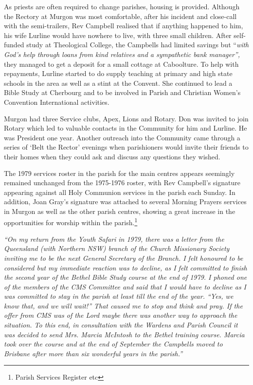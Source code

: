 As priests are often required to change parishes, housing is provided. Although the Rectory at Murgon was most comfortable, after his incident and close-call with the semi-trailers, Rev Campbell realised that if anything happened to him, his wife Lurline would have nowhere to live, with three small children. After self-funded study at Theological College, the Campbells had limited savings but ``\emph{with God's help through loans from kind relatives and a sympathetic bank manager'',} they managed to get a deposit for a small cottage at Caboolture. To help with repayments, Lurline started to do supply teaching at primary and high state schools in the area as well as a stint at the Convent. She continued to lead a Bible Study at Cherbourg and to be involved in Parish and Christian Women's Convention International activities.



Murgon had three Service clubs, Apex, Lions and Rotary. Don was invited to join Rotary which led to valuable contacts in the Community for him and Lurline. He was President one year. Another outreach into the Community came through a series of `Belt the Rector' evenings when parishioners would invite their friends to their homes when they could ask and discuss any questions they wished.



The 1979 services roster in the parish for the main centres appears seemingly remained unchanged from the 1975-1976 roster, with Rev Campbell's signature appearing against all Holy Communion services in the parish each Sunday. In addition, Joan Gray's signature was attached to several Morning Prayers services in Murgon as well as the other parish centres, showing a great increase in the opportunities for worship within the parish.\footnote{Parish Services Register etc}


\emph{``On my return from the Youth Safari in 1979, there was a letter from the Queensland (with Northern NSW) branch of the Church Missionary Society inviting me to be the next General Secretary of the Branch. I felt honoured to be considered but my immediate reaction was to decline, as I felt committed to finish the second year of the Bethel Bible Study course at the end of 1979. I phoned one of the members of the CMS Committee and said that I would have to decline as I was committed to stay in the parish at least till the end of the year. ``Yes, we know that, and we will wait!'' That caused me to stop and think and pray. If the offer from CMS was of the Lord maybe there was another way to approach the situation. To this end, in consultation with the Wardens and Parish Council it was decided to send Mrs. Marcia McIntosh to the Bethel training course. Marcia took over the course and at the end of September the Campbells moved to Brisbane after more than six wonderful years in the parish.''}



